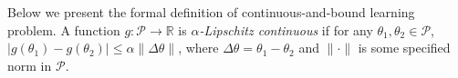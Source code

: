 \documentclass{article}
\begin{document}


Below we present the formal definition of continuous-and-bound learning problem. A function $ g:\mathcal{P}\rightarrow \mathbb{R} $ is \emph{$ \alpha $-Lipschitz continuous} if for any $ \theta_1,\theta_2 \in \mathcal{P} $, $ |g(\theta_1)-g(\theta_2)|\leq \alpha \|\Delta\theta \| $, where $ \Delta\theta= \theta_1-\theta_2 $ and $ \|\cdot\| $ is some specified norm in $ \mathcal{P} $. 
\end{document}
